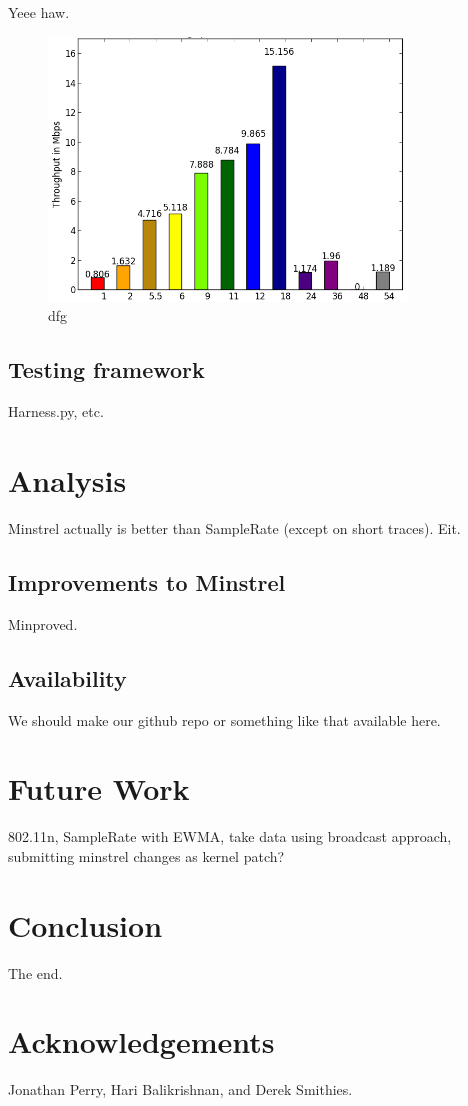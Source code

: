 \documentclass[letterpaper,twocolumn,10pt]{article}
\begin{document}
Yeee haw.
\begin{figure}[htb]
  \hspace{-4em}\includegraphics[width=3.75in]{constant.png}\vspace{-2em}
  \caption{dfg}
\end{figure}

\subsection{Testing framework}

Harness.py, etc.

\section{Analysis}

Minstrel actually is better than SampleRate (except on short traces). Eit.

\subsection{Improvements to Minstrel}
Minproved.

\subsection{Availability}
We should make our github repo or something like that available here.

\section{Future Work}

802.11n, SampleRate with EWMA, take data using broadcast approach,  submitting minstrel changes as kernel patch?

\section{Conclusion}

The end.

{\footnotesize 
}


\section{Acknowledgements}
Jonathan Perry, Hari Balikrishnan, and Derek Smithies. 
\end{document}
